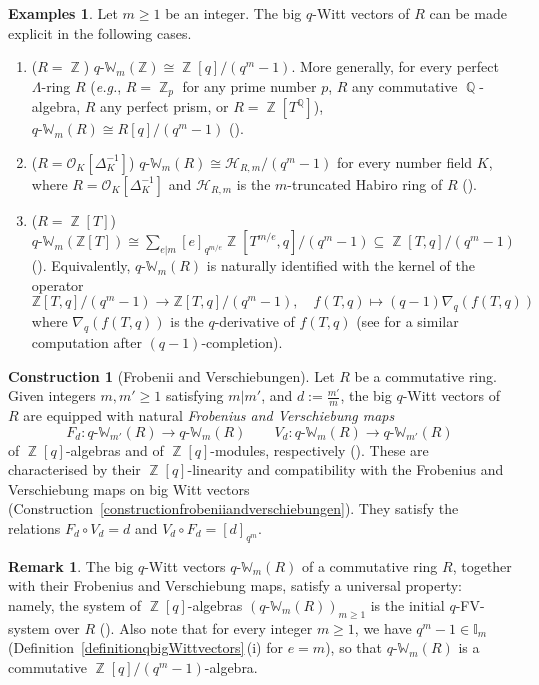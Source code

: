 \documentclass[10pt,twoside]{scrarticle}
\newlength{\mar} \setlength{\mar}{1cm}%
\newlength{\len}
\theoremstyle{definition}
\newtheorem{remark}[theorem]{Remark}
\newtheorem{examples}[theorem]{Examples}
\newtheorem{construction}[theorem]{Construction}
\DeclareMathOperator{\Z}{\mathbb{Z}}
\DeclareMathOperator{\Q}{\mathbb{Q}}
\newcommand{\nbrrg}{\mathcal{O}_K[\Delta_K^{-1}]}
\newcommand{\qW}{q\text{-}\mathbb{W}}
\newcommand{\qWm}{q\text{-}\mathbb{W}_m}
\newcommand{\qWmm}{q\text{-}\mathbb{W}_{m'}}
\renewcommand{\ge}{\geqslant}
\numberwithin{equation}{theorem}
\begin{document}
\begin{examples}\label{examplesqWittvectors}
    Let $m \ge 1$ be an integer. The big $q$-Witt vectors of $R$ 
    can be made explicit in the following cases.
    \begin{enumerate}
        \item\label{item:Z} ($R=\Z$) $\qW_m(\mathbb{Z}) \cong \Z[q]/(q^m-1)$. More generally, for every perfect $\Lambda$-ring $R$ (\textit{e.g.}, $R=\Z_p$ for any prime number $p$, $R$ any commutative $\Q$-algebra, $R$ any perfect prism, or $R=\Z[T^{\Q}]$), $\qWm(R) \cong R[q]/(q^m-1)$ (\cite[Corollary~2.37]{wagner_q-witt_2024}).
        \item ($R=\nbrrg$) $\qWm(R) \cong \mathcal{H}_{R,m}/(q^m-1)$ for every number field $K$, where $R=\nbrrg$ and $\mathcal{H}_{R,m}$ is the $m$-truncated Habiro ring of $R$ (\cite[Theorem~2.9]{wagner_q-hodge_2025}).
        \item ($R=\Z[T]$) $\qW_m(\mathbb{Z}[T]) \cong \sum_{e|m}[e]_{q^{m/e}}\Z[T^{m/e},q]/(q^m-1) \subseteq \Z[T,q]/(q^m-1)$ (\cite[Proposition~2.36]{wagner_q-witt_2024}). Equivalently, $\qWm(R)$ is naturally identified with the kernel of the operator
        $$\mathbb{Z}[T,q]/(q^m-1)\longrightarrow \mathbb{Z}[T,q]/(q^m-1), \quad f(T,q) \longmapsto (q-1)\nabla_q(f(T,q))$$
        where $\nabla_q(f(T,q))$ is the $q$-derivative of $f(T,q)$ (see \cite[Theorem~4.27]{wagner_q-witt_2024} for a similar computation after $(q-1)$-completion).
    \end{enumerate}
\end{examples}

\begin{construction}[Frobenii and Verschiebungen]\label{constructionqfrobeniiandverschiebungen}
    Let $R$ be a commutative ring. Given integers $m, m' \ge 1$ satisfying $m|m'$, and $d := \frac{m'}{m}$, the big $q$-Witt vectors of $R$ are equipped with natural \emph{Frobenius and Verschiebung maps}
    $$F_d : \qWmm(R) \longrightarrow \qWm(R) \quad \quad V_d : \qWm(R) \longrightarrow \qWmm(R)$$
    of $\Z[q]$-algebras and of $\Z[q]$-modules, respectively (\cite[proof of Lemma~2.9]{wagner_q-witt_2024}). These are characterised by their $\Z[q]$-linearity and compatibility with the Frobenius and Verschiebung maps on big Witt vectors (Construction~\ref{constructionfrobeniiandverschiebungen}). They satisfy the relations $F_d \circ V_d = d$ and $V_d \circ F_d = [d]_{q^m}$.
\end{construction}

\begin{remark}\label{remarkuniversalpropertyqWittvectors}
    The big $q$-Witt vectors $\qWm(R)$ of a commutative ring $R$, together with their Frobenius and Verschiebung maps, satisfy a universal property: namely, the system of $\Z[q]$-algebras $(\qWm(R))_{m \ge 1}$ is the initial $q$-FV-system over $R$ (\cite[Definition~2.8 and Lemma~2.9]{wagner_q-witt_2024}). Also note that for every integer $m \ge 1$, we have $q^m-1 \in \mathbb{I}_m$ (Definition~\ref{definitionqbigWittvectors}\,(i) for $e=m$), so that $\qWm(R)$ is a commutative $\Z[q]/(q^m-1)$-algebra.
\end{remark}
\end{document}
